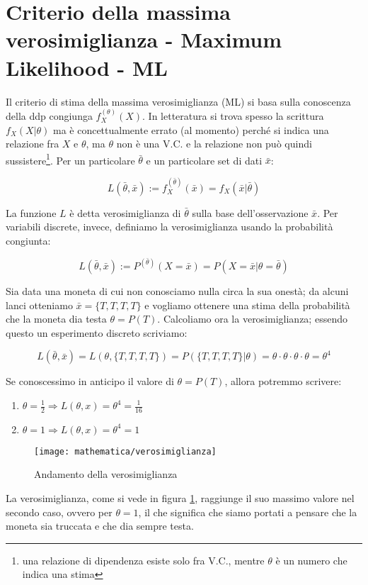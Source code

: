 \section{Criterio della massima verosimiglianza - Maximum Likelihood - ML}
Il criterio di stima della massima verosimiglianza  (ML) si basa sulla conoscenza della ddp congiunga $f_X^{(\theta)}(X)$. In letteratura si trova spesso la scrittura $f_X(X|\theta)$ ma è concettualmente errato (al momento) perché si indica una relazione fra $X$ e $\theta$, ma $\theta$ non è una V.C. e la relazione non può quindi sussistere\footnote{una relazione di dipendenza esiste solo fra V.C., mentre $\theta$ è un numero che indica una stima}.\newline
Per un particolare $\bar{\theta}$ e un particolare set di dati $\bar{x}$:

    \[ L(\bar{\theta},\bar{x}):=f_X^{(\bar{\theta})}(\bar{x})=f_X(\bar{x}|\bar{\theta}) \]

La funzione $L$ è detta verosimiglianza di $\bar{\theta}$ sulla base dell'osservazione $\bar{x}$. Per variabili discrete, invece, definiamo la verosimiglianza  usando la probabilità congiunta:

    \[ L(\bar{\theta},\bar{x}):=P^{(\bar{\theta})}(X=\bar{x})=P(X=\bar{x}|\theta=\bar{\theta}) \]

\begin{esempio} %
Sia data una moneta di cui non conosciamo nulla circa la sua onestà; da alcuni lanci otteniamo $\bar{x}=\{T,T,T,T\}$ e vogliamo ottenere una stima della probabilità che la moneta dia testa $\theta=P(T)$. Calcoliamo ora la verosimiglianza; essendo questo un esperimento discreto scriviamo:

    \[ L(\bar{\theta},\bar{x})=L(\theta,\{T,T,T,T\})=P(\{T,T,T,T\}|\theta)=\theta \cdot \theta \cdot \theta \cdot \theta = \theta^4 \]

Se conoscessimo in anticipo il valore di $\theta=P(T)$, allora potremmo scrivere:

\begin{enumerate}
  \item $\theta=\frac{1}{2}  \Rightarrow L(\theta,x)=\theta^4=\frac{1}{16}$
  \item $\theta=1  \Rightarrow L(\theta,x)=\theta^4=1$
\end{enumerate}

  \begin{figure}[htbp]
      \centering
      \texttt{[image: mathematica/verosimiglianza]}
      \caption{Andamento della verosimiglianza\label{fig:verosim1}}
  \end{figure}

La verosimiglianza, come si vede in figura \ref{fig:verosim1}, raggiunge il suo massimo valore nel secondo caso, ovvero per $\theta=1$, il che significa che siamo portati a pensare che la moneta sia truccata e che dia sempre testa.
\end{esempio}

